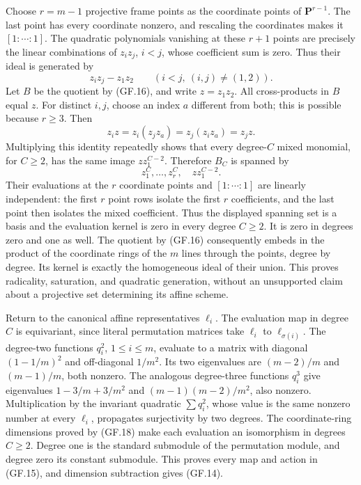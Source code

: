 \documentclass[
  10pt,
]{article}
\begin{document}
Choose \(r=m-1\) projective frame points as the coordinate points of
\(\mathbf P^{r-1}\). The last point has every coordinate nonzero, and
rescaling the coordinates makes it \([1:\cdots:1]\). The quadratic
polynomials vanishing at these \(r+1\) points are precisely the linear
combinations of \(z_iz_j\), \(i<j\), whose coefficient sum is zero. Thus
their ideal is generated by \[
z_i z_j-z_1z_2\qquad(i<j,\ (i,j)\ne(1,2)).
\tag{GF.16}
\] Let \(B\) be the quotient by (GF.16), and write \(z=z_1z_2\). All
cross-products in \(B\) equal \(z\). For distinct \(i,j\), choose an
index \(a\) different from both; this is possible because \(r\ge3\).
Then \[
z_i z=z_i(z_jz_a)=z_j(z_i z_a)=z_j z.
\tag{GF.17}
\] Multiplying this identity repeatedly shows that every degree-\(C\)
mixed monomial, for \(C\ge2\), has the same image \(z z_1^{C-2}\).
Therefore \(B_C\) is spanned by \[
z_1^C,\ldots,z_r^C,\quad z z_1^{C-2}.
\tag{GF.18}
\] Their evaluations at the \(r\) coordinate points and \([1:\cdots:1]\)
are linearly independent: the first \(r\) point rows isolate the first
\(r\) coefficients, and the last point then isolates the mixed
coefficient. Thus the displayed spanning set is a basis and the
evaluation kernel is zero in every degree \(C\ge2\). It is zero in
degrees zero and one as well. The quotient by (GF.16) consequently
embeds in the product of the coordinate rings of the \(m\) lines through
the points, degree by degree. Its kernel is exactly the homogeneous
ideal of their union. This proves radicality, saturation, and quadratic
generation, without an unsupported claim about a projective set
determining its affine scheme.

Return to the canonical affine representatives \(\ell_i\). The
evaluation map in degree \(C\) is equivariant, since literal permutation
matrices take \(\ell_i\) to \(\ell_{\sigma(i)}\). The degree-two
functions \(q_i^2\), \(1\le i\le m\), evaluate to a matrix with diagonal
\((1-1/m)^2\) and off-diagonal \(1/m^2\). Its two eigenvalues are
\((m-2)/m\) and \((m-1)/m\), both nonzero. The analogous degree-three
functions \(q_i^3\) give eigenvalues \(1-3/m+3/m^2\) and
\((m-1)(m-2)/m^2\), also nonzero. Multiplication by the invariant
quadratic \(\sum q_i^2\), whose value is the same nonzero number at
every \(\ell_i\), propagates surjectivity by two degrees. The
coordinate-ring dimensions proved by (GF.18) make each evaluation an
isomorphism in degrees \(C\ge2\). Degree one is the standard submodule
of the permutation module, and degree zero its constant submodule. This
proves every map and action in (GF.15), and dimension subtraction gives
(GF.14).
\end{document}
